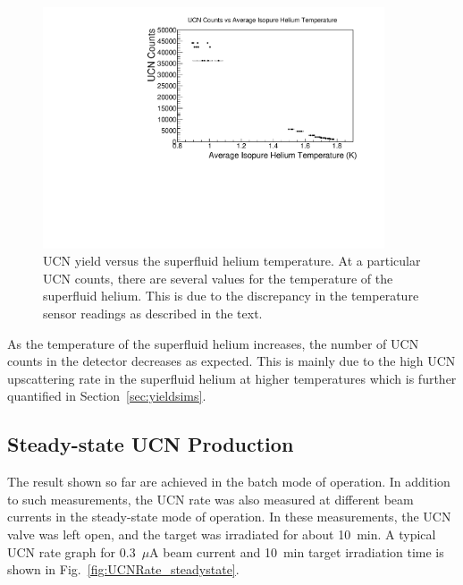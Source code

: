\begin{figure}[h!]
  \centering
  \includegraphics[width=0.9\textwidth]{counts_vs_temp.pdf}
  \caption[UCN yield versus the superfluid helium temperature]{UCN
    yield versus the superfluid helium temperature. At a particular
    UCN counts, there are several values for the temperature of the
    superfluid helium. This is due to the discrepancy in the
    temperature sensor readings as described in the text.}
  \label{fig:counts_vs_temp}
\end{figure}

As the temperature of the superfluid helium increases, the number of
UCN counts in the detector decreases as expected. This is mainly due
to the high UCN upscattering rate in the superfluid helium at higher
temperatures which is further quantified in
Section~\ref{sec:yieldsims}.


\subsection{Steady-state UCN Production\label{sec:steadystate}}

The result shown so far are achieved in the batch mode of
operation. In addition to such measurements, the UCN rate was also
measured at different beam currents in the steady-state mode of
operation. In these measurements, the UCN valve was left open, and the
target was irradiated for about 10~min. A typical UCN rate graph for
0.3~$\mu$A beam current and 10~min target irradiation time is shown in
Fig.~\ref{fig:UCNRate_steadystate}.


